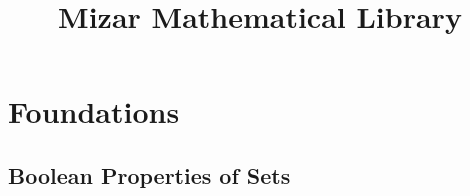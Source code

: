 \documentclass[leqno,oneside]{amsbook} %
\title{Mizar Mathematical Library}
\begin{document}
\maketitle
\tableofcontents
\mainmatter

\chapter{Foundations}

\section{Boolean Properties of Sets}
\end{document}
